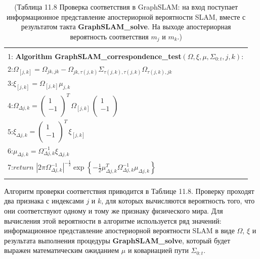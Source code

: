 \documentclass[10pt,a4paper]{article}
\begin{document}
\begin{table}[H]
\begin{center}
\begin{tabular}{|l|}
\hline
{}\\
1:\textbf{ Algorithm GraphSLAM\_correspondence\_test}$(\varOmega,\xi,\mu,\varSigma_{0:t},j,k):$ \\
2:\hspace{5mm}$\varOmega_{[j,k]}=\varOmega_{jk,jk}-\varOmega_{jk,\tau(j,k)}\varSigma_{\tau(j,k),\tau(j,k)}\varOmega_{\tau(j,k),jk}$\\
3:\hspace{5mm}$\xi_{[j,k]}=\varOmega_{[j,k]}\mu_{j,k}$\\
4:\hspace{5mm}$\varOmega_{\varDelta j,k}=\left(\begin{array}{c}1\\-1\\
\end{array} \right)^T\,\varOmega_{[j,k]}\,\left(\begin{array}{c}1\\-1\\
\end{array} \right)$\\
5:\hspace{5mm}$\xi_{\varDelta j,k}=\left(\begin{array}{c}1\\-1\\
\end{array} \right)^T\,\xi_{[j,k]}$\\
6:\hspace{5mm}$\mu_{\varDelta j,k}=\varOmega_{\varDelta j,k}^{-1}\xi_{\varDelta j,k}$\\
7:\hspace{5mm}$\textit{return}\,\,|2\pi\varOmega_{\varDelta j,k}^{-1}|^{-\frac{1}{2}}\exp\left\lbrace -\frac{1}{2}\mu_{\varDelta j,k}^T\varOmega_{\varDelta j,k}^{-1}\mu_{\varDelta j,k}\right\rbrace $\\
{}\\
\hline
\end{tabular}
\caption{(Таблица 11.8 Проверка соответствия в GraphSLAM: на вход поступает информационное представление апостериорной вероятности SLAM, вместе с результатом такта \textbf{GraphSLAM\_solve}.  На выходе апостериорная вероятность соответствия $m_j$ и $m_k$.)}
\end{center}
\end{table}

Алгоритм проверки соответствия приводится в Таблице 11.8. Проверку проходят два признака с индексами $j$ и $k$, для которых вычисляются вероятность того, что они соответствуют одному и тому же признаку физического мира. Для вычисления этой вероятности в алгоритме используется ряд значений: информационное представление апостериорной вероятности SLAM в виде $\varOmega$, $\xi$ и результата выполнения процедуры \textbf{GraphSLAM\_solve}, который будет выражен математическим ожиданием $\mu$ и ковариацией пути $\varSigma_{0:t}$.
\end{document}
